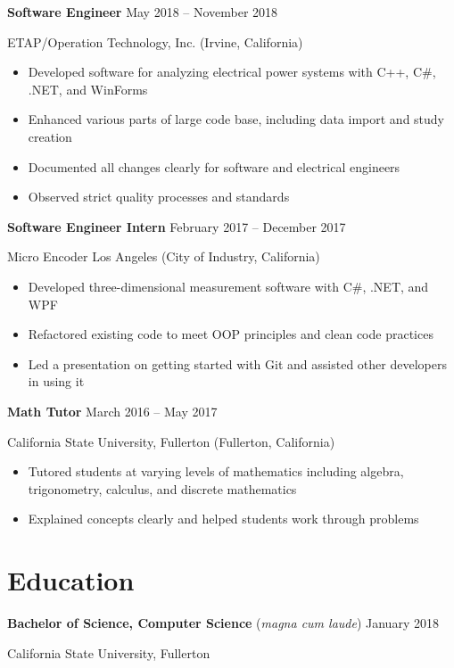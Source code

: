 \documentclass[10pt]{article}
\newcommand{\titleheader}[2]{\textbf{#1} \hfill #2}
\newcommand{\titleextraheader}[3]{\textbf{#1} (#3) \hfill #2}
\newcommand{\locheader}[2]{#1 (#2)}
\newcommand{\instheader}[1]{#1}
\begin{document}
	\titleheader{Software Engineer}{May 2018 -- November 2018}

	\locheader{ETAP/Operation Technology, Inc.}{Irvine, California}

	\begin{itemize}
		\item Developed software for analyzing electrical power systems with C++, C\#, .NET, and WinForms
		\item Enhanced various parts of large code base, including data import and study creation
		\item Documented all changes clearly for software and electrical engineers
		\item Observed strict quality processes and standards
	\end{itemize}

	\titleheader{Software Engineer Intern}{February 2017 -- December 2017}

	\locheader{Micro Encoder Los Angeles}{City of Industry, California}

	\begin{itemize}
		\item Developed three-dimensional measurement software with C\#, .NET, and WPF
		\item Refactored existing code to meet OOP principles and clean code practices
		\item Led a presentation on getting started with Git and assisted other developers in using it
	\end{itemize}

	\titleheader{Math Tutor}{March 2016 -- May 2017}

	\locheader{California State University, Fullerton}{Fullerton, California}

	\begin{itemize}
		\item Tutored students at varying levels of mathematics including algebra, trigonometry, calculus, and discrete mathematics
		\item Explained concepts clearly and helped students work through problems
	\end{itemize}

	\section*{Education}

	\titleextraheader{Bachelor of Science, Computer Science}{January 2018}{\textit{magna cum laude}}

	\instheader{California State University, Fullerton}
\end{document}

